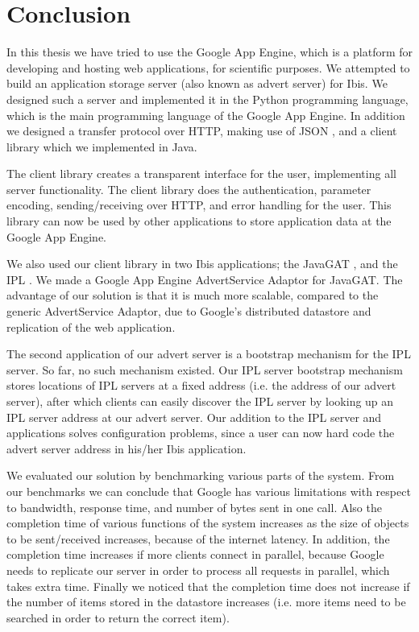 \section{Conclusion}
\label{conclusion}
In this thesis we have tried to use the Google App Engine, which is a platform
for developing and hosting web applications, for scientific purposes. We
attempted to build an application storage server (also known as advert server)
for Ibis. We designed such a server and implemented it in the Python programming
language, which is the main programming language of the Google App Engine. In
addition we designed a transfer protocol over HTTP, making use of JSON
\cite{json-www}, and a client library which we implemented in Java.

The client library creates a transparent interface for the user, implementing
all server functionality. The client library does the authentication, parameter
encoding, sending/receiving over HTTP, and error handling for the user. This
library can now be used by other applications to store application data at the
Google App Engine.

We also used our client library in two Ibis applications; the JavaGAT
\cite{javagat-www}, and the IPL \cite{ipl-www}. We made a Google App Engine
AdvertService Adaptor for JavaGAT. The advantage of our solution is that it is
much more scalable, compared to the generic AdvertService Adaptor, due to
Google's distributed datastore and replication of the web application.

The second application of our advert server is a bootstrap mechanism for the
IPL server. So far, no such mechanism existed. Our IPL server bootstrap
mechanism stores locations of IPL servers at a fixed address (i.e. the address
of our advert server), after which clients can easily discover the IPL server
by looking up an IPL server address at our advert server. Our addition to the
IPL server and applications solves configuration problems, since a user can now
hard code the advert server address in his/her Ibis application.

We evaluated our solution by benchmarking various parts of the system. From our
benchmarks we can conclude that Google has various limitations with respect to
bandwidth, response time, and number of bytes sent in one call. Also the
completion time of various functions of the system increases as the size of
objects to be sent/received increases, because of the internet latency. In
addition, the completion time increases if more clients connect in parallel,
because Google needs to replicate our server in order to process all requests in
parallel, which takes extra time. Finally we noticed that the completion time
does not increase if the number of items stored in the datastore increases
(i.e. more items need to be searched in order to return the correct item).

